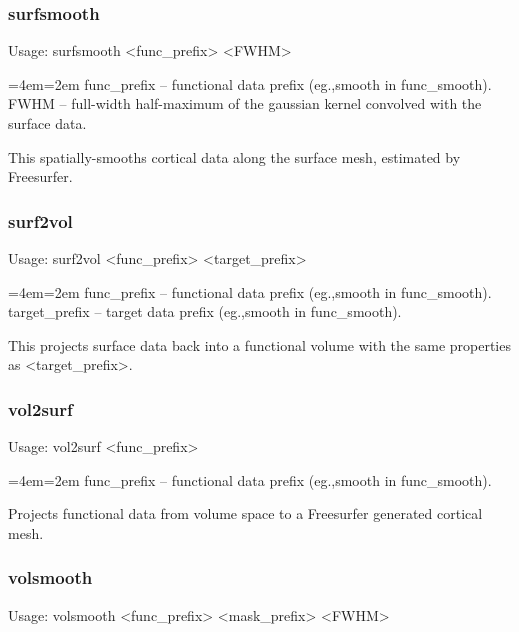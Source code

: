 \documentclass[final,titlepage,letterpaper,oneside,12pt]{article}
\renewcommand{\texttt}[2][BrickRed]{\textcolor{#1}{\ttfamily #2}}%
\newenvironment{blockquote}{%
  \par%
  \medskip
  \leftskip=4em\rightskip=2em%
  \noindent\ignorespaces}{%
  \par\medskip}
\begin{document}
\subsubsection{surfsmooth}
Usage: \texttt{surfsmooth <func\_prefix> <FWHM>}

\begin{blockquote}
func\_prefix -- functional data prefix (eg.,smooth in func\_smooth). \\
FWHM -- full-width half-maximum of the gaussian kernel convolved with the surface data. \
\end{blockquote}

\noindent This spatially-smooths cortical data along the surface mesh, estimated by Freesurfer.

\subsubsection{surf2vol}
Usage: \texttt{surf2vol <func\_prefix> <target\_prefix>}

\begin{blockquote}
func\_prefix -- functional data prefix (eg.,smooth in func\_smooth). \\
target\_prefix -- target data prefix (eg.,smooth in func\_smooth). \
\end{blockquote}

\noindent This projects surface data back into a functional volume with the same properties as <target\_prefix>.

\subsubsection{vol2surf}
Usage: \texttt{vol2surf <func\_prefix>}

\begin{blockquote}
func\_prefix -- functional data prefix (eg.,smooth in func\_smooth).
\end{blockquote}

\noindent Projects functional data from volume space to a Freesurfer generated cortical mesh.

\subsubsection{volsmooth}
Usage: \texttt{volsmooth <func\_prefix> <mask\_prefix> <FWHM>}
\end{document}
